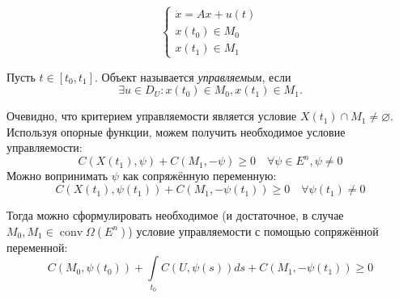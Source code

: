\begin{equation*}
    \begin{cases}
        \dot{x} = Ax + u(t) \\
        x(t_0) \in M_0 \\
        x(t_1) \in M_1
    \end{cases}
\end{equation*}

\begin{defn}
    Пусть $t \in [t_0, t_1]$.
    Объект называется \textit{управляемым}, если
    \begin{equation*}
        \exists u \in D_U\colon x(t_0) \in M_0, x(t_1) \in M_1.
    \end{equation*}
\end{defn}

Очевидно, что критерием управляемости является условие $X(t_1) \cap M_1 \neq \varnothing$.
Используя опорные функции, можем получить необходимое условие управляемости:
\begin{equation*}
    C(X(t_1), \psi) + C(M_1, -\psi) \geqslant 0 \quad \forall \psi \in E^n, \psi \neq 0
\end{equation*}
Можно вопринимать $\psi$ как сопряжённую переменную:
\begin{equation*}
    C(X(t_1), \psi(t_1)) + C(M_1, -\psi(t_1)) \geqslant 0 \quad \forall \psi(t_1) \neq 0
\end{equation*}

Тогда можно сформулировать необходимое (и достаточное, в случае $M_0, M_1 \in \operatorname{conv}\Omega(E^n)$) условие управляемости с помощью сопряжённой переменной:
\begin{equation*}
    C(M_0, \psi(t_0)) + \int\limits_{t_0} C(U, \psi(s)) ds + C(M_1, -\psi(t_1)) \geqslant 0
\end{equation*}